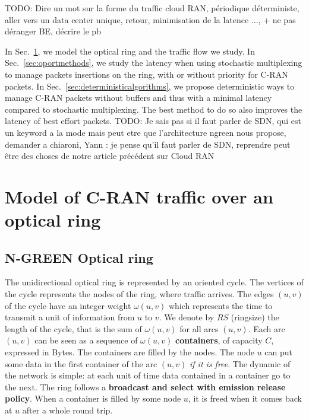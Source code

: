 \documentclass[]{algotel}
\newcommand{\todo}[1]{{\color{red} TODO: {#1}}}
\begin{document}
\todo{Dire un mot sur la forme du traffic cloud RAN, périodique déterministe, aller vers un data center unique, retour, minimisation de la latence ..., + ne pas déranger BE, décrire le pb}

In Sec.~\ref{sec:model}, we model the optical ring and the traffic flow we study. In Sec.~\ref{sec:oportmethods}, we study the latency when using stochastic multiplexing to manage packets insertions on the ring, with or without priority for C-RAN packets. In Sec.~\ref{sec:deterministicalgorithms}, we propose deterministic ways to manage C-RAN packets without buffers and thus with a minimal latency compared to stochastic multiplexing. The best method to do so also improves the latency of best effort packets.
\todo{Je sais pas si il faut parler de SDN, qui est un keyword a la mode mais peut etre que l'architecture ngreen nous propose, demander a chiaroni, 
Yann : je pense qu'il faut parler de SDN, reprendre peut être des choses de notre article précédent sur Cloud RAN}


\section{Model of C-RAN traffic over an optical ring}
\label{sec:model}
% 
% 
          
  \subsection{N-GREEN Optical ring}
   
  The unidirectional optical ring is represented by an oriented cycle. The vertices of the cycle represents the nodes of the ring, where traffic arrives. The edges $(u,v)$ of the cycle have an integer weight $\omega(u,v)$ which represents the time to transmit a unit of information from $u$ to $v$. We denote by $RS$ (ringsize) the length of the cycle, that is the sum of $\omega(u,v)$ for all arcs $(u,v)$.  Each arc $(u,v)$ can be seen as a sequence of $\omega(u,v)$ {\bf containers}, of capacity $C$, expressed in Bytes.  The containers are filled  by the nodes. The node $u$ can put some data in the first container of the arc $(u,v)$ \emph{if it is free}. 
  The dynamic of the network is simple: at each unit of time data contained in a container go to the next.
   The ring follows a {\bf broadcast and select with emission release policy}. When a container is filled by some node $u$,
   it is freed when it comes back at $u$ after a whole round trip.
   
\end{document}
